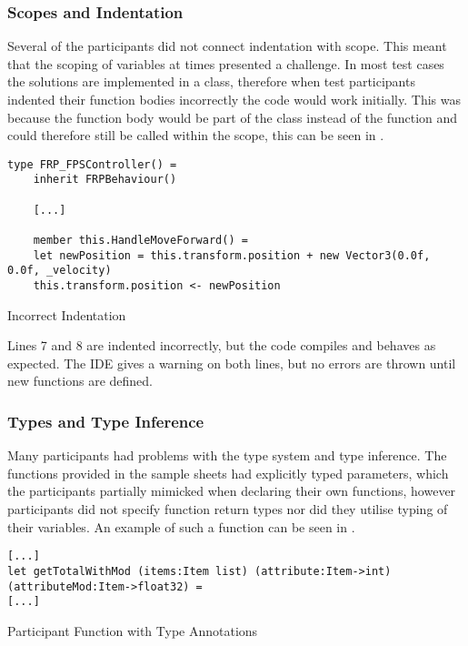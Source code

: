 \subsubsection{Scopes and Indentation}
Several of the participants did not connect indentation with scope. This meant that the scoping of variables at times presented a challenge. In most test cases the solutions are implemented in a class, therefore when test participants indented their function bodies incorrectly the code would work initially. This was because the function body would be part of the class instead of the function and could therefore still be called within the scope, this can be seen in .

\begin{listing}[H]
\begin{verbatim}
type FRP_FPSController() =
    inherit FRPBehaviour()

    [...]

    member this.HandleMoveForward() =
    let newPosition = this.transform.position + new Vector3(0.0f, 0.0f, _velocity)
    this.transform.position <- newPosition
\end{verbatim}
\caption{Incorrect Indentation}
\label{lst:scope-prob}
\end{listing}

Lines 7 and 8 are indented incorrectly, but the code compiles and behaves as expected. The \gls{IDE} gives a warning on both lines, but no errors are thrown until new  functions are defined.

\subsubsection{Types and Type Inference}
Many participants had problems with the type system and type inference. The functions provided in the sample sheets had explicitly typed parameters, which the participants partially mimicked when declaring their own functions, however participants did not specify function return types nor did they utilise typing of their variables. An example of such a function can be seen in .

\begin{listing}[H]
\begin{verbatim}
[...]
let getTotalWithMod (items:Item list) (attribute:Item->int) (attributeMod:Item->float32) =
[...]
\end{verbatim}
\caption{Participant Function with Type Annotations}
\label{lst:part-func}
\end{listing}

